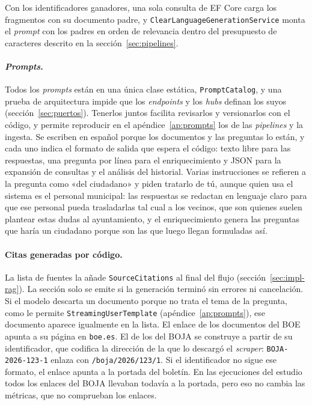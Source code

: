 Con los identificadores ganadores, una sola consulta de EF Core carga los fragmentos con su documento padre, y \texttt{ClearLanguageGenerationService} monta el \emph{prompt} con los padres en orden de relevancia dentro del presupuesto de caracteres descrito en la sección~\ref{sec:pipelines}.

\paragraph{\emph{Prompts}.} Todos los \emph{prompts} están en una única clase estática, \texttt{PromptCatalog}, y una prueba de arquitectura impide que los \emph{endpoints} y los \emph{hubs} definan los suyos (sección~\ref{sec:puertos}). Tenerlos juntos facilita revisarlos y versionarlos con el código, y permite reproducir en el apéndice~\ref{ap:prompts} los de las \emph{pipelines} y la ingesta. Se escriben en español porque los documentos y las preguntas lo están, y cada uno indica el formato de salida que espera el código: texto libre para las respuestas, una pregunta por línea para el enriquecimiento y JSON para la expansión de consultas y el análisis del historial. Varias instrucciones se refieren a la pregunta como «del ciudadano» y piden tratarlo de tú, aunque quien usa el sistema es el personal municipal: las respuestas se redactan en lenguaje claro para que ese personal pueda trasladarlas tal cual a los vecinos, que son quienes suelen plantear estas dudas al ayuntamiento, y el enriquecimiento genera las preguntas que haría un ciudadano porque son las que luego llegan formuladas así.

\paragraph{Citas generadas por código.} La lista de fuentes la añade \texttt{SourceCitations} al final del flujo (sección~\ref{sec:impl-rag}). La sección solo se emite si la generación terminó sin errores ni cancelación. Si el modelo descarta un documento porque no trata el tema de la pregunta, como le permite \texttt{StreamingUserTemplate} (apéndice~\ref{ap:prompts}), ese documento aparece igualmente en la lista. El enlace de los documentos del BOE apunta a su página en \texttt{boe.es}. El de los del BOJA se construye a partir de su identificador, que codifica la dirección de la que lo descargó el \emph{scraper}: \texttt{BOJA-2026-123-1} enlaza con \texttt{/boja/2026/123/1}. Si el identificador no sigue ese formato, el enlace apunta a la portada del boletín. En las ejecuciones del estudio todos los enlaces del BOJA llevaban todavía a la portada, pero eso no cambia las métricas, que no comprueban los enlaces.

